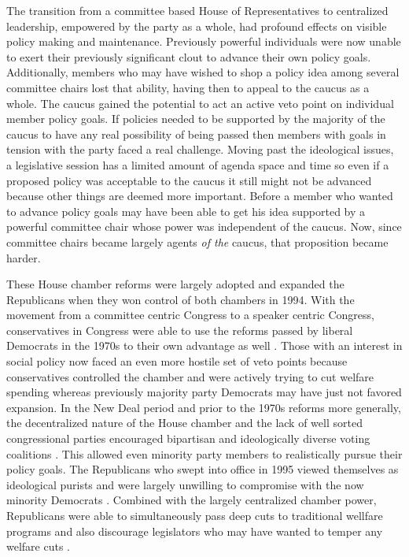 \documentclass[12pt]{article}
\begin{document}
The transition from a committee based House of Representatives to centralized leadership, empowered by the party as a whole, had profound effects on visible policy making and maintenance. Previously powerful individuals were now unable to exert their previously significant clout to advance their own policy goals. Additionally, members who may have wished to shop a policy idea among several committee chairs lost that ability, having then to appeal to the caucus as a whole. The caucus gained the potential to act an active veto point on individual member policy goals. If policies needed to be supported by the majority of the caucus to have any real possibility of being passed then members with goals in tension with the party faced a real challenge. Moving past the ideological issues, a legislative session has a limited amount of agenda space and time so even if a proposed policy was acceptable to the caucus it still might not be advanced because other things are deemed more important. Before a member who wanted to advance policy goals may have been able to get his idea supported by a powerful committee chair whose power was independent of the caucus. Now, since committee chairs became largely agents \emph{of the} caucus, that proposition became harder.

These House chamber reforms were largely adopted and expanded the Republicans when they won control of both chambers in 1994. With the movement from a committee centric Congress to a speaker centric Congress, conservatives in Congress were able to use the reforms passed by liberal Democrats in the 1970s to their own advantage as well \citep{zelizer2007}. Those with an interest in social policy now faced an even more hostile set of veto points because conservatives controlled the chamber and were actively trying to cut welfare spending whereas previously majority party Democrats may have just not favored expansion. In the New Deal period and prior to the 1970s reforms more generally, the decentralized nature of the House chamber and the lack of well sorted congressional parties encouraged bipartisan and ideologically diverse voting coalitions \citep{poole1997}. This allowed even minority party members to realistically pursue their policy goals. The Republicans who swept into office in 1995 viewed themselves as ideological purists and were largely unwilling to compromise with the now minority Democrats \citep{hacker2006, theriault2013}. Combined with the largely centralized chamber power, Republicans were able to simultaneously pass deep cuts to traditional wellfare programs and also discourage legislators who may have wanted to temper any welfare cuts \citep{aldrich2000}. 
\end{document}
